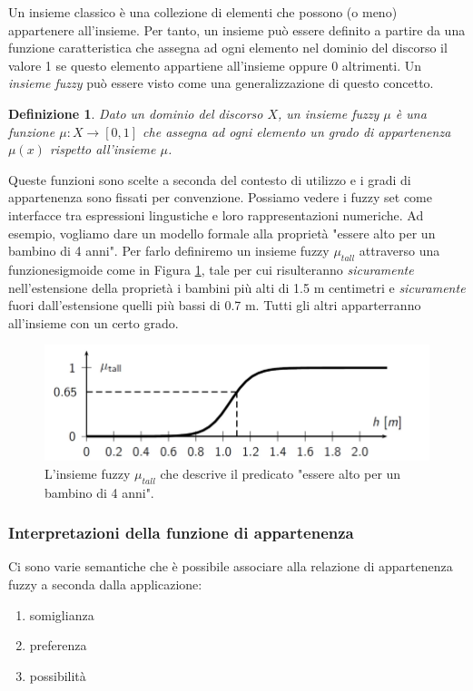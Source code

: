 \documentclass[10pt,a4paper]{article}
\newtheorem{definition}{Definizione}
\begin{document}
Un insieme classico è una collezione di elementi che possono (o meno) appartenere all'insieme. Per tanto, un insieme può essere definito a partire da una funzione caratteristica che assegna ad ogni elemento nel dominio del discorso il valore 1 se questo elemento appartiene all'insieme oppure 0 altrimenti. Un 	\emph{insieme fuzzy} può essere visto come una generalizzazione di questo concetto.
\begin{definition}
 Dato un dominio del discorso $X$, un insieme fuzzy $\mu$ è una funzione $\mu : X \to [0,1]$ che assegna ad ogni elemento un \emph{grado di appartenenza} $\mu(x)$ rispetto all'insieme $\mu$.
\end{definition}
 Queste funzioni sono scelte a seconda del contesto di utilizzo e i gradi di appartenenza sono fissati per convenzione. Possiamo vedere i fuzzy set come interfacce tra espressioni lingustiche e loro rappresentazioni numeriche. Ad esempio, vogliamo dare un modello formale alla proprietà "essere alto per un bambino di 4 anni". Per farlo definiremo un insieme fuzzy $\mu_{tall}$ attraverso una funzionesigmoide come in Figura \ref{fig:23}, tale per cui risulteranno \emph{sicuramente} nell'estensione della proprietà i bambini più alti di 1.5 m centimetri e \emph{sicuramente} fuori dall'estensione quelli più bassi di 0.7 m. Tutti gli altri apparterranno all'insieme con un certo grado.

\begin{figure}
\centering
\includegraphics[scale=0.3]{img/tall.png}
\caption{L'insieme fuzzy $\mu_{tall}$ che descrive il predicato "essere alto per un bambino di 4 anni".}
\label{fig:23}
\end{figure}

\subsubsection{Interpretazioni della funzione di appartenenza}

Ci sono varie semantiche che è possibile associare alla relazione di appartenenza fuzzy a seconda dalla applicazione:

\begin{enumerate}
\item{somiglianza}
\item{preferenza}
\item{possibilità}
\end{enumerate}
\end{document}
